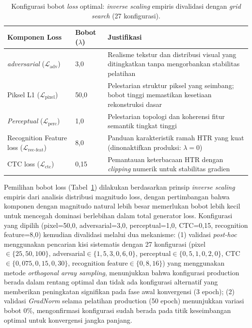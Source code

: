 \documentclass[12pt,a4paper]{article}
\begin{document}
\begin{table}[H]
  \renewcommand{\arraystretch}{1.3}
  \caption[Konfigurasi bobot \textit{loss} optimal]{Konfigurasi bobot \textit{loss} optimal: \textit{inverse scaling} empiris divalidasi dengan \textit{grid search} (27 konfigurasi).}
  \label{table:optimal_weights}
  \small

  \footnotesize
  \begin{tabular}{|l|p{2.2cm}|p{5.3cm}|}
    \hline
    \textbf{Komponen Loss}                                     & \textbf{Bobot ($\lambda$)} & \textbf{Justifikasi}                                                                             \\
    \hline
    \textit{adversarial} ($\mathcal{L}_{\text{adv}}$)          & 3,0                        & Realisme tekstur dan distribusi visual yang ditingkatkan tanpa mengorbankan stabilitas pelatihan \\
    \hline
    Piksel L1 ($\mathcal{L}_{\text{pixel}}$)                   & 50,0                       & Pelestarian struktur piksel yang seimbang; bobot tinggi memastikan kesetiaan rekonstruksi dasar  \\
    \hline
    \textit{Perceptual} ($\mathcal{L}_{\text{perc}}$)          & 1,0                        & Pelestarian topologi dan koherensi fitur semantik tingkat tinggi                                 \\
    \hline
    Recognition Feature loss ($\mathcal{L}_{\text{rec-feat}}$) & 8,0                        & Panduan karakteristik ramah HTR yang kuat (dinonaktifkan produksi: $\lambda=0$)                  \\
    \hline
    CTC loss ($\mathcal{L}_{\text{ctc}}$)                      & 0,15                       & Pemantauan keterbacaan HTR dengan \textit{clipping} numerik untuk stabilitas gradien             \\
    \hline
  \end{tabular}
\end{table}

Pemilihan bobot loss (Tabel~\ref{table:optimal_weights}) dilakukan berdasarkan prinsip \textit{inverse scaling} empiris dari analisis distribusi magnitudo loss, dengan pertimbangan bahwa komponen dengan magnitudo natural lebih besar memerlukan bobot lebih kecil untuk mencegah dominasi berlebihan dalam total generator loss. Konfigurasi yang dipilih (pixel=50,0, adversarial=3,0, perceptual=1,0, CTC=0,15, recognition feature=8,0) kemudian divalidasi melalui dua mekanisme: (1) validasi \textit{post-hoc} menggunakan pencarian kisi sistematis dengan 27 konfigurasi (pixel$\in\{25,50,100\}$, adversarial$\in\{1,5,3,0,6,0\}$, perceptual$\in\{0,5,1,0,2,0\}$, CTC$\in\{0,075,0,15,0,30\}$, recognition feature$\in\{0,8,16\}$) yang menggunakan metode \textit{orthogonal array sampling}, menunjukkan bahwa konfigurasi production berada dalam rentang optimal dan tidak ada konfigurasi alternatif yang memberikan peningkatan signifikan pada fase awal konvergensi (3 epoch); (2) validasi \textit{GradNorm} selama pelatihan production (50 epoch) menunjukkan variasi bobot 0\%, mengonfirmasi konfigurasi sudah berada pada titik keseimbangan optimal untuk konvergensi jangka panjang.
\end{document}
